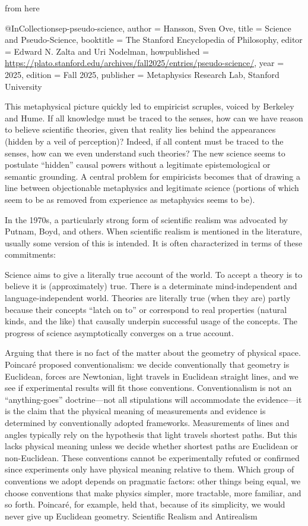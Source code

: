 from here

@InCollection{sep-pseudo-science, author       =	{Hansson, Sven Ove}, title
=	{{Science and Pseudo-Science}}, booktitle    =	{The {Stanford} Encyclopedia
of Philosophy}, editor       =	{Edward N. Zalta and Uri Nodelman}, howpublished
=	{\url{https://plato.stanford.edu/archives/fall2025/entries/pseudo-science/}},
year         =	{2025}, edition      =	{{F}all 2025}, publisher    =
{Metaphysics Research Lab, Stanford University} }


This metaphysical picture quickly led to empiricist scruples, voiced by Berkeley
and Hume. If all knowledge must be traced to the senses, how can we have reason
to believe scientific theories, given that reality lies behind the appearances
(hidden by a veil of perception)? Indeed, if all content must be traced to the
senses, how can we even understand such theories? The new science seems to
postulate “hidden” causal powers without a legitimate epistemological or
semantic grounding. A central problem for empiricists becomes that of drawing a
line between objectionable metaphysics and legitimate science (portions of which
seem to be as removed from experience as metaphysics seems to be).


In the 1970s, a particularly strong form of scientific realism was advocated by
Putnam, Boyd, and others. When scientific realism is mentioned in the
literature, usually some version of this is intended. It is often characterized
in terms of these commitments:

Science aims to give a literally true account of the world. To accept a theory
is to believe it is (approximately) true. There is a determinate
mind-independent and language-independent world. Theories are literally true
(when they are) partly because their concepts “latch on to” or correspond to
real properties (natural kinds, and the like) that causally underpin successful
usage of the concepts. The progress of science asymptotically converges on a
true account.

Arguing that there is no fact of the matter about the geometry of physical
space. Poincaré proposed conventionalism: we decide conventionally that geometry
is Euclidean, forces are Newtonian, light travels in Euclidean straight lines,
and we see if experimental results will fit those conventions. Conventionalism
is not an “anything-goes” doctrine—not all stipulations will accommodate the
evidence—it is the claim that the physical meaning of measurements and evidence
is determined by conventionally adopted frameworks. Measurements of lines and
angles typically rely on the hypothesis that light travels shortest paths. But
this lacks physical meaning unless we decide whether shortest paths are
Euclidean or non-Euclidean. These conventions cannot be experimentally refuted
or confirmed since experiments only have physical meaning relative to them.
Which group of conventions we adopt depends on pragmatic factors: other things
being equal, we choose conventions that make physics simpler, more tractable,
more familiar, and so forth. Poincaré, for example, held that, because of its
simplicity, we would never give up Euclidean geometry. Scientific Realism and
Antirealism


